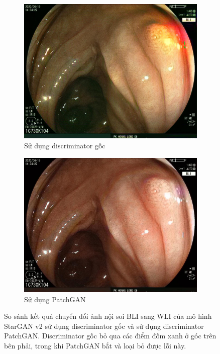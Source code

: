 \documentclass[12pt]{extreport}
\begin{document}
\begin{figure}[H]
    \centering
    \begin{subfigure}[H]{0.48\textwidth}
        \centering
        \includegraphics[width=\linewidth]{figure36.jpg}
        \caption{Sử dụng discriminator gốc}
    \end{subfigure}
    \begin{subfigure}[H]{0.48\textwidth}
        \centering
        \includegraphics[width=\linewidth]{figure35.jpg}
        \caption{Sử dụng PatchGAN}
    \end{subfigure}
    \caption{So sánh kết quả chuyển đổi ảnh nội soi BLI sang WLI của mô hình StarGAN v2 sử dụng discriminator gốc và sử dụng discriminator PatchGAN. Discriminator gốc bỏ qua các điểm đốm xanh ở góc trên bên phải, trong khi PatchGAN bắt và loại bỏ được lỗi này.}
\end{figure}
\end{document}
